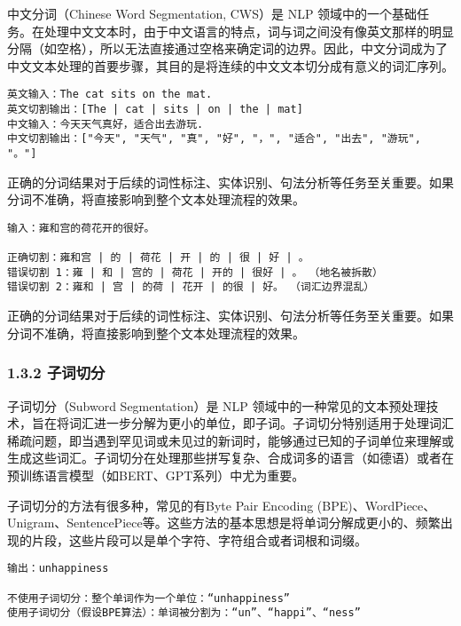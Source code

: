 \documentclass[12pt,a4paper]{book}
\begin{document}
中文分词（Chinese Word Segmentation, CWS）是 NLP
领域中的一个基础任务。在处理中文文本时，由于中文语言的特点，词与词之间没有像英文那样的明显分隔（如空格），所以无法直接通过空格来确定词的边界。因此，中文分词成为了中文文本处理的首要步骤，其目的是将连续的中文文本切分成有意义的词汇序列。

\begin{verbatim}
英文输入：The cat sits on the mat.
英文切割输出：[The | cat | sits | on | the | mat]
中文输入：今天天气真好，适合出去游玩.
中文切割输出：["今天", "天气", "真", "好", "，", "适合", "出去", "游玩", "。"]
\end{verbatim}

正确的分词结果对于后续的词性标注、实体识别、句法分析等任务至关重要。如果分词不准确，将直接影响到整个文本处理流程的效果。

\begin{verbatim}
输入：雍和宫的荷花开的很好。

正确切割：雍和宫 | 的 | 荷花 | 开 | 的 | 很 | 好 | 。
错误切割 1：雍 | 和 | 宫的 | 荷花 | 开的 | 很好 | 。 （地名被拆散）
错误切割 2：雍和 | 宫 | 的荷 | 花开 | 的很 | 好。 （词汇边界混乱）
\end{verbatim}

正确的分词结果对于后续的词性标注、实体识别、句法分析等任务至关重要。如果分词不准确，将直接影响到整个文本处理流程的效果。

\subsubsection{1.3.2 子词切分}\label{ux5b50ux8bcdux5207ux5206}

子词切分（Subword Segmentation）是 NLP
领域中的一种常见的文本预处理技术，旨在将词汇进一步分解为更小的单位，即子词。子词切分特别适用于处理词汇稀疏问题，即当遇到罕见词或未见过的新词时，能够通过已知的子词单位来理解或生成这些词汇。子词切分在处理那些拼写复杂、合成词多的语言（如德语）或者在预训练语言模型（如BERT、GPT系列）中尤为重要。

子词切分的方法有很多种，常见的有Byte Pair Encoding
(BPE)、WordPiece、Unigram、SentencePiece等。这些方法的基本思想是将单词分解成更小的、频繁出现的片段，这些片段可以是单个字符、字符组合或者词根和词缀。

\begin{verbatim}
输出：unhappiness

不使用子词切分：整个单词作为一个单位：“unhappiness”
使用子词切分（假设BPE算法）：单词被分割为：“un”、“happi”、“ness”
\end{verbatim}
\end{document}

